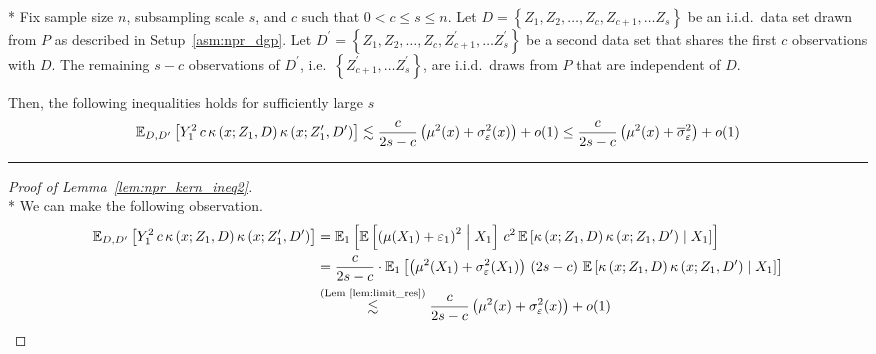 \begin{lem}\label{lem:npr_kern_ineq2}\mbox{}\\*
	Fix sample size $n$, subsampling scale $s$, and $c$ such that $0 < c \leq s \leq n$.
	Let $D = \left\{Z_1, Z_2, \dotsc, Z_c, Z_{c+1}, \dotsc Z_s \right\}$ be an i.i.d.\ data set drawn from $P$ as described in Setup~\ref{asm:npr_dgp}.
	Let $D^{\prime} = \left\{Z_1, Z_2, \dotsc, Z_c, Z_{c+1}^{\prime}, \dotsc Z_s^{\prime} \right\}$ be a second data set that shares the first $c$ observations with $D$.
	The remaining $s - c$ observations of $D^{\prime}$, i.e.\ $\left\{Z_{c+1}^{\prime}, \dotsc Z_s^{\prime} \right\}$, are i.i.d.\ draws from $P$ that are independent of $D$.

	Then, the following inequalities holds for sufficiently large $s$
	\begin{equation}
		\begin{aligned}
			\mathbb{E}_{D, D^{\prime}}\left[Y^{2}_{1} \, c \, \kappa\left(x; Z_{1}, D\right)\kappa\left(x; Z_{1}^{\prime}, D^{\prime}\right)\right]
		 & \lesssim  \frac{c}{2s - c} \left(\mu^2(x) + \sigma^2_{\varepsilon}(x)\right) + o(1)         
		 \leq \frac{c}{2s - c} \left(\mu^2(x) + \overline{\sigma}^2_{\varepsilon}\right) + o(1)          \\
		\end{aligned}
	\end{equation}
\end{lem}

\hrule
\begin{proof}[Proof of Lemma~\ref{lem:npr_kern_ineq2}]\mbox{}\\*
	We can make the following observation.
	\begin{equation}
		\begin{aligned}
			 \mathbb{E}_{D, D^{\prime}}\left[Y^2_{1} \, c \, \kappa\left(x; Z_{1}, D\right)\kappa\left(x; Z_{1}^{\prime}, D^{\prime}\right)\right] 
			 & = \mathbb{E}_{1}\left[\mathbb{E}\left[\left(\mu(X_1) + \varepsilon_1\right)^2 \; \middle| \; X_1\right] \, c^2 \, \mathbb{E}\left[\kappa\left(x; Z_{1}, D\right)\kappa\left(x; Z_{1}, D^{\prime}\right) \; \middle| \; X_1\right]\right]\\
			 & = \frac{c}{2s - c} \cdot \mathbb{E}_{1}\left[\left(\mu^2(X_1) + \sigma^2_{\varepsilon}(X_1)\right) \, \left(2s - c\right) \, 
			 \mathbb{E}\left[\kappa\left(x; Z_{1}, D\right)\kappa\left(x; Z_{1}, D^{\prime}\right) \; \middle| \; X_1\right]\right]\\
			 & \overset{\text{(Lem~\ref{lem:limit_res})}}{\lesssim} \frac{c}{2s - c} \left(\mu^2(x) + \sigma^2_{\varepsilon}(x)\right) + o(1)
		\end{aligned}
	\end{equation}
\end{proof}

